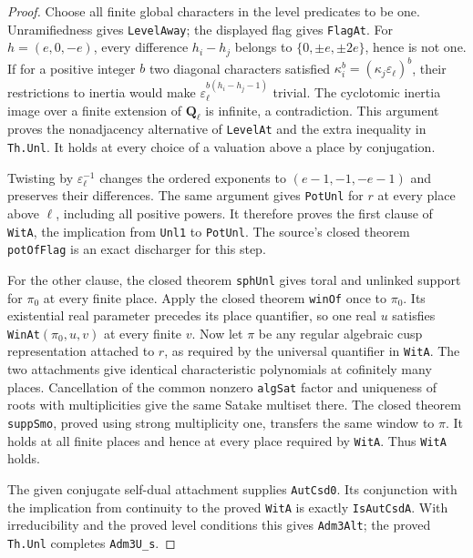 \begin{proof}
Choose all finite global characters in the level predicates to be one.
Unramifiedness gives \texttt{LevelAway}; the displayed flag gives
\texttt{FlagAt}. For $h=(e,0,-e)$, every difference $h_i-h_j$ belongs
to $\{0,\pm e,\pm2e\}$, hence is not one. If for a positive integer
$b$ two diagonal characters satisfied
$\kappa_i^b=(\kappa_j\varepsilon_\ell)^b$, their restrictions to
inertia would make
$\varepsilon_\ell^{b(h_i-h_j-1)}$ trivial. The cyclotomic inertia
image over a finite extension of $\mathbf Q_\ell$ is infinite, a
contradiction. This argument proves the nonadjacency alternative of
\texttt{LevelAt} and the extra inequality in \texttt{Th.Unl}.
It holds at every choice of a valuation above a place by conjugation.

Twisting by $\varepsilon_\ell^{-1}$ changes the ordered exponents to
$(e-1,-1,-e-1)$ and preserves their differences. The same argument
gives \texttt{PotUnl} for $r$ at every place above $\ell$, including
all positive powers. It therefore proves the first clause of
\texttt{WitA}, the implication from \texttt{Unl1} to
\texttt{PotUnl}. The source's closed theorem \texttt{potOfFlag}
is an exact discharger for this step.

For the other clause, the closed theorem \texttt{sphUnl} gives toral
and unlinked support for $\pi_0$ at every finite place. Apply the
closed theorem \texttt{winOf} once to $\pi_0$. Its existential real
parameter precedes its place quantifier, so one real $u$ satisfies
\texttt{WinAt}$(\pi_0,u,v)$ at every finite $v$.
Now let $\pi$ be any regular algebraic cusp representation attached
to $r$, as required by the universal quantifier in \texttt{WitA}.
The two attachments give identical characteristic polynomials at
cofinitely many places. Cancellation of the common nonzero
\texttt{algSat} factor and uniqueness of roots with multiplicities
give the same Satake multiset there. The closed theorem
\texttt{suppSmo}, proved using strong multiplicity one, transfers
the same window to $\pi$. It holds at all finite places and hence
at every place required by \texttt{WitA}. Thus \texttt{WitA} holds.

The given conjugate self-dual attachment supplies \texttt{AutCsd0}.
Its conjunction with the implication from continuity to the proved
\texttt{WitA} is exactly \texttt{IsAutCsdA}. With irreducibility
and the proved level conditions this gives \texttt{Adm3Alt}; the
proved \texttt{Th.Unl} completes \texttt{Adm3U\_s}.
\end{proof}

